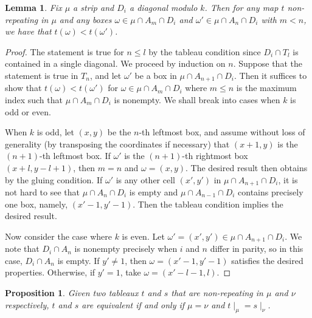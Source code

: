 \documentclass[11pt,reqno]{amsart}
\newcommand*{\restrict}[1]{{\mid}_{#1}}
\theoremstyle{definition}
\theoremstyle{problem}
\theoremstyle{plain}
\newtheorem{proposition}[definition]{Proposition}
\newtheorem{lemma}[definition]{Lemma}
\theoremstyle{remark}
\theoremstyle{theorem}
\numberwithin{equation}{section}
\numberwithin{figure}{section}
\theoremstyle{definition}
\theoremstyle{problem}
\theoremstyle{plain}
\begin{document}
\begin{lemma}\label{lem:19}
  Fix $\mu$ a strip and $D_i$ a diagonal modulo $k$.  Then for any map
  $t$ non-repeating in $\mu$ and any boxes
  $\omega \in \mu \cap A_m \cap D_i$ and
  $\omega' \in \mu \cap A_n \cap D_i$ with $m < n$, we have that
  $t(\omega) < t(\omega')$.
\end{lemma}
\begin{proof}
  The statement is true for $n \leq l$ by the tableau condition since
  $D_i \cap T_l$ is contained in a single diagonal.  We proceed by
  induction on $n$.  Suppose that the statement is true in $T_n$, and
  let $\omega'$ be a box in $\mu \cap A_{n+1} \cap D_i$.  Then it
  suffices to show that $t(\omega) < t(\omega')$ for
  $\omega \in \mu \cap A_m \cap D_i$ where $m \leq n$ is the maximum
  index such that $\mu \cap A_m \cap D_i$ is nonempty. We shall break
  into cases when $k$ is odd or even.

  When $k$ is odd, let $(x,y)$ be the $n$-th leftmost box, and assume
  without loss of generality (by transposing the coordinates if
  necessary) that $(x+1,y)$ is the $(n+1)$-th leftmost box.  If
  $\omega'$ is the $(n+1)$-th rightmost box $(x+l,y-l+1)$, then
  $m = n$ and $\omega = (x,y)$.  The desired result then obtains by
  the gluing condition.  If $\omega'$ is any other cell $(x',y')$ in
  $\mu \cap A_{n+1} \cap D_i$, it is not hard to see that
  $\mu \cap A_n \cap D_i$ is empty and $\mu \cap A_{n-1} \cap D_i$
  contains precisely one box, namely, $(x'-1,y'-1)$.  Then the tableau
  condition implies the desired result.
  
  Now consider the case where $k$ is even.  Let
  $\omega'=(x',y')\in \mu \cap A_{n+1}\cap D_i$.  We note that
  $D_i \cap A_n$ is nonempty precisely when $i$ and $n$ differ in
  parity, so in this case, $D_i \cap A_n$ is empty.  If $y' \neq 1$,
  then $\omega = (x'-1,y'-1)$ satisfies the desired properties.
  Otherwise, if $y' = 1$, take $\omega = (x'-l-1,l)$.
\end{proof}

\begin{proposition}\label{prop:2}
  Given two tableaux $t$ and $s$ that are non-repeating in $\mu$ and
  $\nu$ respectively, $t$ and $s$ are equivalent if and only if
  $\mu=\nu$ and $t\restrict\mu = s\restrict\nu$.
\end{proposition}
\end{document}

